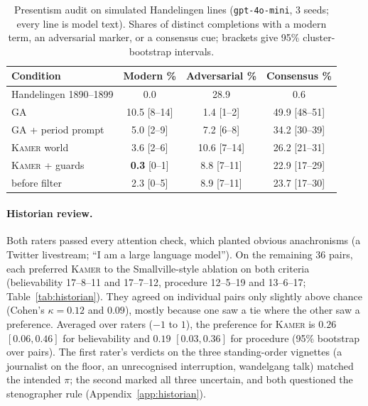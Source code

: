 \documentclass[sigconf,review,anonymous]{acmart}
\newcommand{\sys}{\textsc{Kamer}}
\begin{document}
\begin{table}[t]
\caption{Presentism audit on simulated Handelingen lines
(\texttt{gpt-4o-mini}, 3 seeds; every line is model text). Shares of
distinct completions with a modern term, an adversarial marker, or a
consensus cue; brackets give 95\% cluster-bootstrap intervals.}
\label{tab:presentism}
\centering\small
\setlength{\tabcolsep}{2.5pt}
\begin{tabular}{lccc}
\toprule
Condition & Modern \% & Adversarial \% & Consensus \% \\
\midrule
Handelingen 1890--1899 & 0.0 & 28.9 & 0.6 \\
GA~\cite{park2023generative} & 10.5 [8--14] & 1.4 [1--2] & 49.9 [48--51] \\
GA + period prompt & 5.0 [2--9] & 7.2 [6--8] & 34.2 [30--39] \\
\sys{} world & 3.6 [2--6] & 10.6 [7--14] & 26.2 [21--31] \\
\sys{} + guards & \textbf{0.3} [0--1] & 8.8 [7--11] & 22.9 [17--29] \\
\quad before filter & 2.3 [0--5] & 8.9 [7--11] & 23.7 [17--30] \\
\bottomrule
\end{tabular}
\end{table}

\paragraph{Historian review.} Both raters passed every attention check,
which planted obvious anachronisms (a Twitter livestream; ``I am a large
language model''). On the remaining 36 pairs, each preferred \sys{} to the
Smallville-style ablation on both criteria (believability 17--8--11 and
17--7--12, procedure 12--5--19 and 13--6--17; Table~\ref{tab:historian}).
They agreed on individual pairs only slightly above chance (Cohen's
$\kappa = 0.12$ and $0.09$), mostly because one saw a tie where the other
saw a preference. Averaged over raters ($-1$ to $1$), the preference for
\sys{} is $0.26$ $[0.06, 0.46]$ for believability and $0.19$
$[0.03, 0.36]$ for procedure (95\% bootstrap over pairs). The first
rater's verdicts on the three standing-order vignettes (a journalist on the
floor, an unrecognised interruption, wandelgang talk) matched the intended
$\pi$; the second marked all three uncertain, and both questioned the
stenographer rule (Appendix~\ref{app:historian}).



\end{document}
